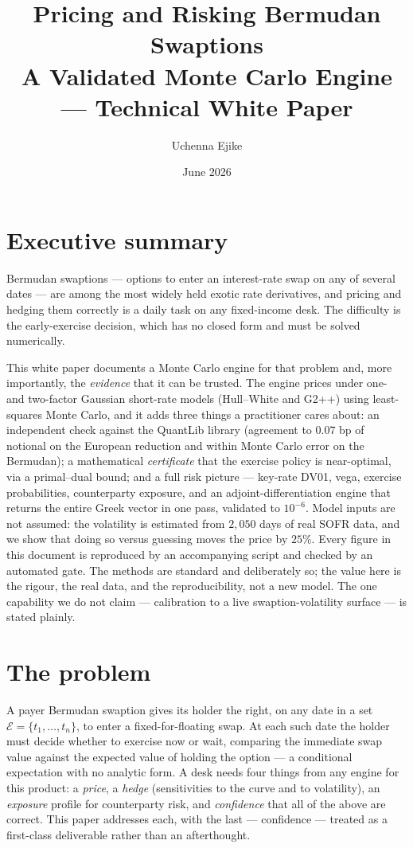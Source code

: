 \documentclass[11pt]{article}
\title{\textbf{Pricing and Risking Bermudan Swaptions}\\[2pt]
\large A Validated Monte Carlo Engine --- Technical White Paper}
\author{Uchenna Ejike}
\date{June 2026}
\theoremstyle{plain}
\theoremstyle{definition}
\begin{document}
\maketitle

\section*{Executive summary}
Bermudan swaptions --- options to enter an interest-rate swap on any of several dates --- are
among the most widely held exotic rate derivatives, and pricing and hedging them correctly is a
daily task on any fixed-income desk. The difficulty is the early-exercise decision, which has no
closed form and must be solved numerically.

This white paper documents a Monte Carlo engine for that problem and, more importantly, the
\emph{evidence} that it can be trusted. The engine prices under one- and two-factor Gaussian
short-rate models (Hull--White and G2++) using least-squares Monte Carlo, and it adds three
things a practitioner cares about: an independent check against the QuantLib library
(agreement to $0.07$ bp of notional on the European reduction and within Monte Carlo error on the
Bermudan); a mathematical \emph{certificate} that the exercise policy is near-optimal, via a
primal--dual bound; and a full risk picture --- key-rate DV01, vega, exercise probabilities,
counterparty exposure, and an adjoint-differentiation engine that returns the entire Greek vector
in one pass, validated to $10^{-6}$. Model inputs are not assumed: the volatility is estimated
from $2{,}050$ days of real SOFR data, and we show that doing so versus guessing moves the price
by $25\%$. Every figure in this document is reproduced by an accompanying script and checked by
an automated gate. The methods are standard and deliberately so; the value here is the rigour,
the real data, and the reproducibility, not a new model. The one capability we do not claim ---
calibration to a live swaption-volatility surface --- is stated plainly.

\tableofcontents

\section{The problem}
A payer Bermudan swaption gives its holder the right, on any date in a set
$\mathcal{E}=\{t_1,\dots,t_n\}$, to enter a fixed-for-floating swap. At each such date the holder
must decide whether to exercise now or wait, comparing the immediate swap value against the
expected value of holding the option --- a conditional expectation with no analytic form. A desk
needs four things from any engine for this product: a \emph{price}, a \emph{hedge} (sensitivities
to the curve and to volatility), an \emph{exposure} profile for counterparty risk, and
\emph{confidence} that all of the above are correct. This paper addresses each, with the last ---
confidence --- treated as a first-class deliverable rather than an afterthought.
\end{document}

